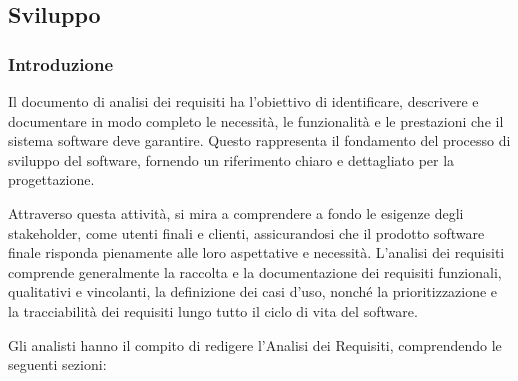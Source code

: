 
\subsection{Sviluppo}
\subsubsection{Introduzione}

Il documento di analisi dei requisiti ha l'obiettivo di identificare,
descrivere e documentare in modo completo le necessità, 
le funzionalità e le prestazioni che il sistema software deve garantire. 
Questo rappresenta il fondamento del processo di sviluppo del software, 
fornendo un riferimento chiaro e dettagliato per la progettazione.

Attraverso questa attività, si mira a comprendere a fondo le esigenze degli stakeholder, 
come utenti finali e clienti, assicurandosi che il prodotto software finale risponda 
pienamente alle loro aspettative e necessità. L’analisi dei requisiti comprende 
generalmente la raccolta e la documentazione dei requisiti funzionali, 
qualitativi e vincolanti, la definizione dei casi d’uso, 
nonché la prioritizzazione e la tracciabilità dei requisiti lungo tutto il ciclo
di vita del software.

Gli analisti hanno il compito di redigere l’Analisi dei Requisiti, comprendendo le seguenti
sezioni:


